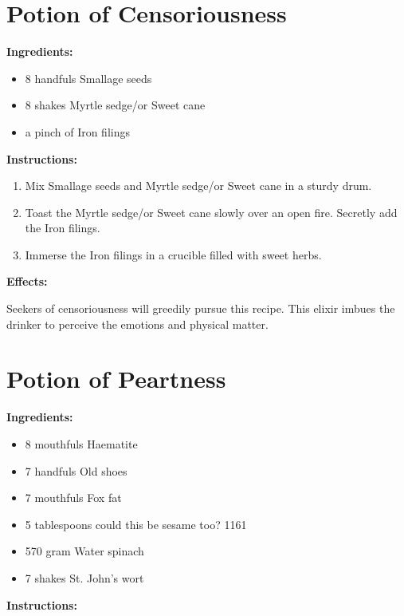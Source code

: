 \documentclass{article}
\begin{document}
\newpage
\section*{Potion of Censoriousness}

\textbf{Ingredients:}

\begin{itemize}
  \item 8 handfuls Smallage seeds
  \item 8 shakes Myrtle sedge/or Sweet cane
  \item a pinch of Iron filings
\end{itemize}

\textbf{Instructions:}

\begin{enumerate}
  \item Mix Smallage seeds and Myrtle sedge/or Sweet cane in a sturdy drum.
  \item Toast the Myrtle sedge/or Sweet cane slowly over an open fire. Secretly add the Iron filings.
  \item Immerse the Iron filings in a crucible filled with sweet herbs.
\end{enumerate}

\textbf{Effects:}

Seekers of censoriousness will greedily pursue this recipe. This elixir imbues the drinker to perceive the emotions and physical matter.

\newpage
\section*{Potion of Peartness}

\textbf{Ingredients:}

\begin{itemize}
  \item 8 mouthfuls Haematite
  \item 7 handfuls Old shoes
  \item 7 mouthfuls Fox fat
  \item 5 tablespoons could this be sesame too? 1161
  \item 570 gram Water spinach
  \item 7 shakes St. John's wort
\end{itemize}

\textbf{Instructions:}
\end{document}
